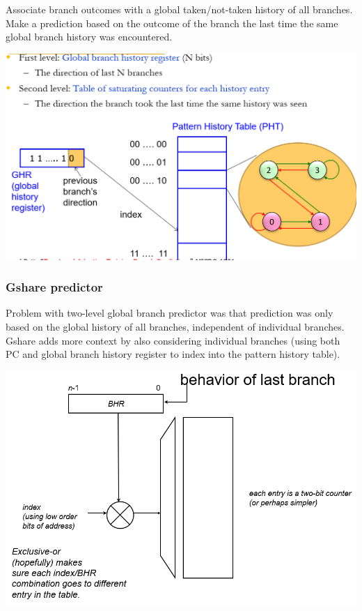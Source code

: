 \documentclass[12pt]{extarticle}
\begin{document}
	Associate branch outcomes with a global taken/not-taken history of all branches. Make a prediction based on the outcome 
	of the branch the last time the same global branch history was encountered.

	\begin{center}
		\includegraphics[scale=0.5]{assets/two-level-global-branch-pred.png}
	\end{center}

	\subsubsection{Gshare predictor}

	Problem with two-level global branch predictor was that prediction was only based on the global history of all branches, 
	independent of individual branches. Gshare adds more context by also considering individual branches (using both PC and 
	global branch history register to index into the pattern history table).

	\begin{center}
		\includegraphics[scale=0.5]{assets/gshare-diagram.png}
	\end{center}
\end{document}
